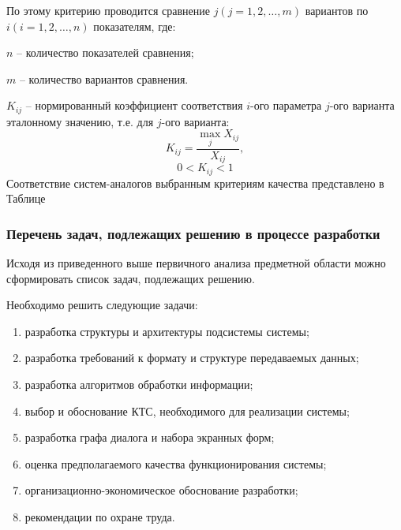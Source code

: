 По этому критерию проводится сравнение $j (j = 1, 2, …, m)$ вариантов по $i (i = 1, 2, …, n)$ показателям, где:

$n$ – количество показателей сравнения;

$m$ – количество вариантов сравнения.

$K_{ij}$ – нормированный коэффициент соответствия $i$-ого параметра $j$-ого варианта эталонному значению, т.е. для $j$-ого варианта:
$$ K_{ij} = \frac{\max_{j} X_{ij}} {X_{ij}}, $$
$$ 0 < K_{ij} < 1 $$
Соответствие систем-аналогов выбранным критериям качества представлено в Таблице

\subsubsection{Перечень задач, подлежащих решению в процессе разработки}

Исходя из приведенного выше первичного анализа предметной области можно сформировать список задач, подлежащих решению.

Необходимо решить следующие задачи:

\begin{enumerate}
\item разработка структуры и архитектуры подсистемы системы; 
\item разработка требований к формату и структуре передаваемых данных;
\item разработка алгоритмов обработки информации;
\item выбор и обоснование КТС, необходимого для реализации системы;
\item разработка графа диалога и набора экранных форм;
\item оценка предполагаемого качества функционирования системы;
\item организационно-экономическое обоснование разработки;
\item рекомендации по охране труда.
\end{enumerate}



